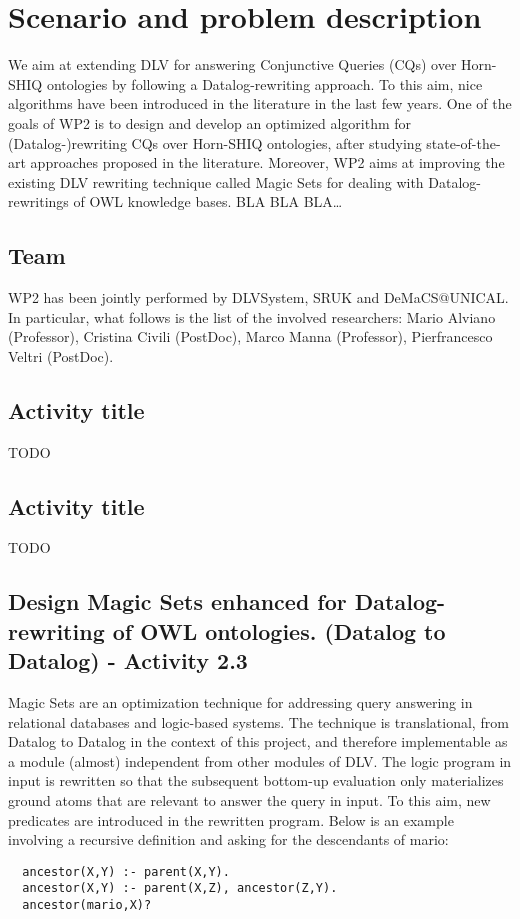 \documentclass[oneside]{book}
\begin{document}
\chapter{Scenario and problem description}

We aim at extending DLV for answering Conjunctive Queries (CQs) over Horn-SHIQ ontologies by following a Datalog-rewriting approach. To this aim, nice algorithms have been introduced in the literature in the last few years. One of the goals of WP2 is to design and develop an optimized algorithm for (Datalog-)rewriting CQs over Horn-SHIQ ontologies, after studying state-of-the-art approaches proposed in the literature. Moreover, WP2 aims at improving the existing DLV rewriting technique called Magic Sets for dealing with Datalog-rewritings of OWL knowledge bases. 
BLA BLA BLA…

\section{Team}
WP2 has been jointly performed by DLVSystem, SRUK and DeMaCS@UNICAL. In particular, what follows is the list of the involved researchers: Mario Alviano (Professor), Cristina Civili (PostDoc), Marco Manna (Professor), Pierfrancesco Veltri (PostDoc).

\section{Activity title}
TODO
\section{Activity title}
TODO
\section{Design Magic Sets enhanced for Datalog-rewriting of OWL ontologies. (Datalog to Datalog) - Activity 2.3}
Magic Sets are an optimization technique for addressing query answering in relational databases and logic-based systems. The technique is translational, from Datalog to Datalog in the context of this project, and therefore implementable as a module (almost) independent from other modules of DLV. The logic program in input is rewritten so that the subsequent bottom-up evaluation only materializes ground atoms that are relevant to answer the query in input. To this aim, new predicates are introduced in the rewritten program. Below is an example involving a recursive definition and asking for the descendants of mario:
\begin{verbatim}
  ancestor(X,Y) :- parent(X,Y).
  ancestor(X,Y) :- parent(X,Z), ancestor(Z,Y).
  ancestor(mario,X)?
\end{verbatim}
\end{document}
